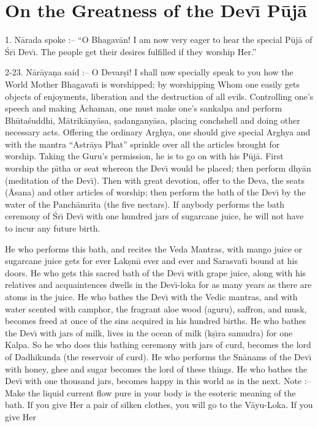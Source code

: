 \chapter{On the Greatness of the Dev\={\i} P\=uj\=a}

1. N\=arada spoke :-- ``O Bhagav\=an! I am now very eager to hear the special P\=uj\=a of \'Sr\={\i} Dev\={\i}. The people get their desires fulfilled if they worship Her.''

2-23. N\=ar\=aya\d{n}a said :-- O Devar\d{s}i! I shall now specially speak to you how the World Mother Bhagavat\={\i} is worshipped; by worshipping Whom one easily gets objects of enjoyments, liberation and the destruction of all evils. Controlling one's speech and making \=Achaman, one must make one's sankalpa and perform Bh\=uta\'suddhi, M\=atrik\=any\=asa, \d{s}adangany\=asa, placing conchshell and doing other necessary acts. Offering the ordinary Arghya, one should give special Arghya and with the mantra ``Astr\=aya Phat'' sprinkle over all the articles brought for worship. Taking the Guru's permission, he is to go on with his P\=uj\=a. First worship the p\={\i}tha or seat whereon the Dev\={\i} would be placed; then perform dhy\=an (meditation of the Dev\={\i}). Then with great devotion, offer to the Deva, the seats (\=Asana) and other articles of worship; then perform the bath of the Dev\={\i} by the water of the Panch\=amrita (the five nectars). If anybody performs the bath ceremony of \'Sr\={\i} Dev\={\i} with one hundred jars of sugarcane juice, he will not have to incur any future birth.

He who performs this bath, and recites the Veda Mantras, with mango juice or sugarcane juice gets for ever Lak\d{s}m\={\i} ever and ever and Sarasvat\={\i} bound at his doors. He who gets this sacred bath of the Dev\={\i} with grape juice, along with his relatives and acquaintences dwells in the Dev\={\i}-loka for as many years as there are atoms in the juice. He who bathes the Dev\={\i} with the Vedic mantras, and with water scented with camphor, the fragrant aloe wood (aguru), saffron, and musk, becomes freed at once of the sins acquired in his hundred births. He who bathes the Dev\={\i} with jars of milk, lives in the ocean of milk (k\d{s}\={\i}ra samudra) for one Kalpa. So he who does this bathing ceremony with jars of curd, becomes the lord of Dadhikunda (the reservoir of curd). He who performs the Sn\=anams of the Dev\={\i} with honey, ghee and sugar becomes the lord of these things. He who bathes the Dev\={\i} with one thousand jars, becomes happy in this world as in the next. Note :-- Make the liquid current flow pure in your body is the esoteric meaning of the bath. If you give Her a pair of silken clothes, you will go to the V\=ayu-Loka. If you give Her

